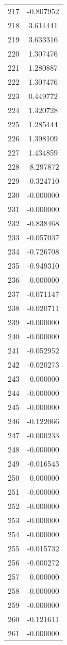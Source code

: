 \documentclass[12pt]{article}
\begin{document}
\begin{longtable}{@{}cc@{}}
217 & -0.807952 \\
218 & 3.614441 \\
219 & 3.633316 \\
220 & 1.307476 \\
221 & 1.280887 \\
222 & 1.307476 \\
223 & 0.449772 \\
224 & 1.320728 \\
225 & 1.285444 \\
226 & 1.398109 \\
227 & 1.434859 \\
228 & -8.297872 \\
229 & -0.324710 \\
230 & -0.000000 \\
231 & -0.000000 \\
232 & -0.838468 \\
233 & -0.057037 \\
234 & -0.726708 \\
235 & -0.949310 \\
236 & -0.000000 \\
237 & -0.071147 \\
238 & -0.020711 \\
239 & -0.000000 \\
240 & -0.000000 \\
241 & -0.052952 \\
242 & -0.020273 \\
243 & -0.000000 \\
244 & -0.000000 \\
245 & -0.000000 \\
246 & -0.122066 \\
247 & -0.000233 \\
248 & -0.000000 \\
249 & -0.016543 \\
250 & -0.000000 \\
251 & -0.000000 \\
252 & -0.000000 \\
253 & -0.000000 \\
254 & -0.000000 \\
255 & -0.015732 \\
256 & -0.000272 \\
257 & -0.000000 \\
258 & -0.000000 \\
259 & -0.000000 \\
260 & -0.121611 \\
261 & -0.000000 \\

\end{longtable}
\end{document}
